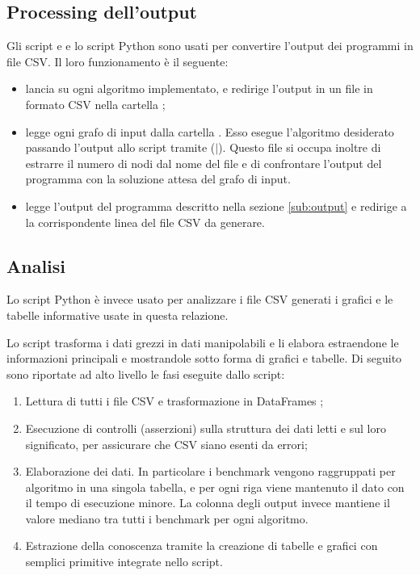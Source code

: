 \subsection{Processing dell'output}

Gli script  e  e lo script Python  sono usati per convertire l'output dei programmi in file CSV. Il loro funzionamento è il seguente:

\begin{itemize}
    \item {} lancia  su ogni algoritmo implementato, e redirige l'output in un file in formato CSV nella cartella ;
    \item {} legge ogni grafo di input dalla cartella . Esso esegue l'algoritmo desiderato passando l'output allo script  tramite  ($\vert$). Questo file si occupa inoltre di estrarre il numero di nodi dal nome del file e di confrontare l'output del programma con la soluzione attesa del grafo di input.
    \item {} legge l'output del programma descritto nella sezione \ref{sub:output} e redirige a  la corrispondente linea del file CSV da generare.
\end{itemize}

\subsection{Analisi}

\noindent Lo script Python  è invece usato per analizzare i file CSV generati i grafici e le tabelle informative usate in questa relazione.

\noindent Lo script trasforma i dati grezzi in dati manipolabili e li
elabora estraendone le informazioni principali e mostrandole sotto
forma di grafici e tabelle. Di seguito sono riportate ad alto
livello le fasi eseguite dallo script:

\begin{enumerate}
    \item Lettura di tutti i file CSV e trasformazione in DataFrames ;
    \item Esecuzione di controlli (asserzioni) sulla struttura dei dati
      letti e sul loro significato, per assicurare che CSV siano esenti da errori;
    \item Elaborazione dei dati. In particolare i benchmark vengono raggruppati
      per algoritmo in una singola tabella, e per ogni riga
      viene mantenuto il dato con il tempo di esecuzione minore. La
      colonna degli output invece mantiene il valore mediano tra tutti
      i benchmark per ogni algoritmo.
    \item Estrazione della conoscenza tramite la creazione di tabelle
      e grafici con semplici primitive integrate nello script.
    \label{script-phase-analysis}
\end{enumerate}

